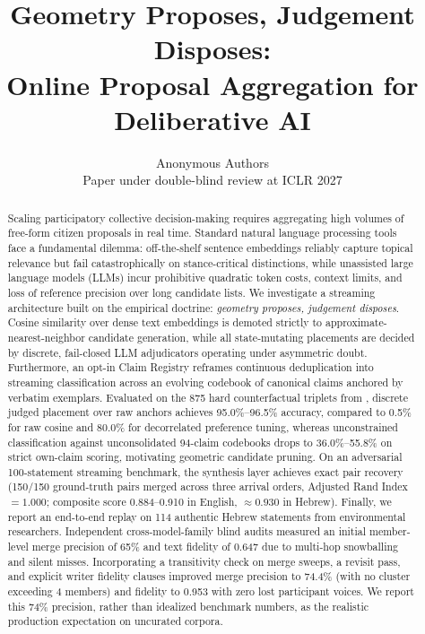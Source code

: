 \documentclass{article}
\title{Geometry Proposes, Judgement Disposes:\\Online Proposal Aggregation for Deliberative AI}
\author{Anonymous Authors \\
Paper under double-blind review at ICLR 2027}
\begin{document}
\maketitle

\begin{abstract}
Scaling participatory collective decision-making requires aggregating high volumes of free-form citizen proposals in real time. Standard natural language processing tools face a fundamental dilemma: off-the-shelf sentence embeddings reliably capture topical relevance but fail catastrophically on stance-critical distinctions, while unassisted large language models (LLMs) incur prohibitive quadratic token costs, context limits, and loss of reference precision over long candidate lists. We investigate a streaming architecture built on the empirical doctrine: \emph{geometry proposes, judgement disposes}. Cosine similarity over dense text embeddings is demoted strictly to approximate-nearest-neighbor candidate generation, while all state-mutating placements are decided by discrete, fail-closed LLM adjudicators operating under asymmetric doubt. Furthermore, an opt-in Claim Registry reframes continuous deduplication into streaming classification across an evolving codebook of canonical claims anchored by verbatim exemplars. Evaluated on the 875 hard counterfactual triplets from \citet{blair2026embeddings}, discrete judged placement over raw anchors achieves 95.0\%--96.5\% accuracy, compared to 0.5\% for raw cosine and 80.0\% for decorrelated preference tuning, whereas unconstrained classification against unconsolidated 94-claim codebooks drops to 36.0\%--55.8\% on strict own-claim scoring, motivating geometric candidate pruning. On an adversarial 100-statement streaming benchmark, the synthesis layer achieves exact pair recovery (150/150 ground-truth pairs merged across three arrival orders, Adjusted Rand Index $=1.000$; composite score 0.884--0.910 in English, $\approx 0.930$ in Hebrew). Finally, we report an end-to-end replay on 114 authentic Hebrew statements from environmental researchers. Independent cross-model-family blind audits measured an initial member-level merge precision of 65\% and text fidelity of 0.647 due to multi-hop snowballing and silent misses. Incorporating a transitivity check on merge sweeps, a revisit pass, and explicit writer fidelity clauses improved merge precision to 74.4\% (with no cluster exceeding 4 members) and fidelity to 0.953 with zero lost participant voices. We report this 74\% precision, rather than idealized benchmark numbers, as the realistic production expectation on uncurated corpora.
\end{abstract}
\end{document}
